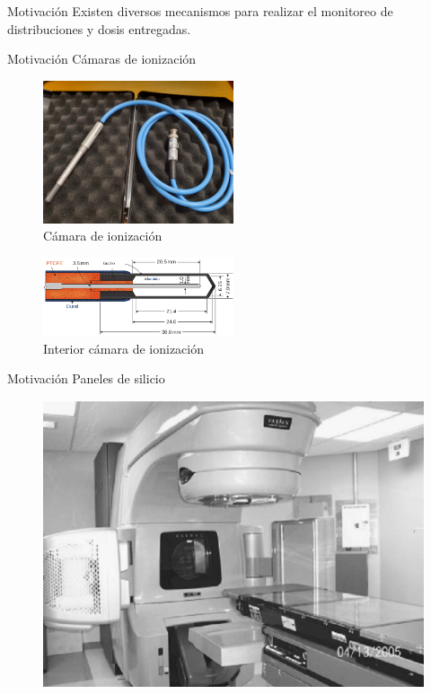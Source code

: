 \documentclass[12pt]{beamer}
\begin{document}
\begin{frame}{Motivación}
	Existen diversos mecanismos para realizar el monitoreo de distribuciones y dosis entregadas.\\
\end{frame}

\begin{frame}{Motivación}
	Cámaras de ionización 

		\begin{figure}[htp]
			\includegraphics[width=0.5\textwidth]{images/camara.jpg}
			\caption{Cámara de ionización}
		\end{figure}
		\begin{figure}[htp]
			\includegraphics[width=0.5\textwidth]{images/camaraIoni.png}
			\caption{Interior cámara de ionización\cite{khan2014the}}
		\end{figure}\par
\end{frame}

\begin{frame}{Motivación}
Paneles de silicio
\begin{figure}
	\centering
	\includegraphics[width=0.7\linewidth]{images/silicio.png}
	\caption{\cite{Yoo2006}}
\end{figure}
\end{frame}
\end{document}
